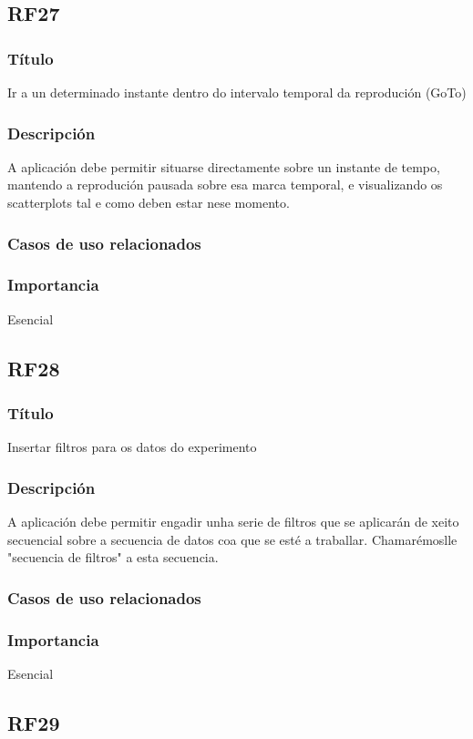 \subsection*{RF27}
\subsubsection{Título}
Ir a un determinado instante dentro do intervalo temporal da reprodución (GoTo)
\subsubsection{Descripción}
A aplicación debe permitir situarse directamente sobre un instante de tempo, mantendo a reprodución pausada sobre esa marca temporal, e visualizando os scatterplots tal e como deben estar nese momento.
\subsubsection{Casos de uso relacionados}
\subsubsection{Importancia}
Esencial

\subsection*{RF28}
\subsubsection{Título}
Insertar filtros para os datos do experimento
\subsubsection{Descripción}
A aplicación debe permitir engadir unha serie de filtros que se aplicarán de xeito secuencial sobre a secuencia de datos coa que se esté a traballar. Chamarémoslle "secuencia de filtros" a esta secuencia.
\subsubsection{Casos de uso relacionados}
\subsubsection{Importancia}
Esencial

\subsection*{RF29}
